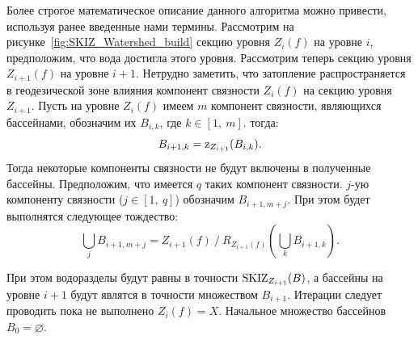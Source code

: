\documentclass[14pt, a4paper]{extreport}
\begin{document}
	Более строгое математическое описание данного алгоритма можно привести, используя ранее введенные нами термины. Рассмотрим на рисунке~\ref{fig:SKIZ_Watershed_build} секцию уровня $Z_i(f)$ на уровне $i$, предположим, что вода достигла этого уровня. Рассмотрим теперь секцию уровня $Z_{i + 1}(f)$ на уровне $i + 1$. Нетрудно заметить, что затопление распространяется в геодезической зоне влияния компонент связности $Z_i(f)$ на секцию уровня $Z_{i+1}$. Пусть на уровне $Z_i(f)$ имеем $m$ компонент связности, являющихся бассейнами, обозначим их $B_{i,k}$, где $k \in [1,~m]$. тогда:\vspace*{-0.3cm}
	\begin{equation*}
		B_{i+1,k} = \textup{z}_{Z_{i + 1}}(B_{i,k}).
		\vspace*{-0.3cm}
		\label{IZ_X(Y)}
	\end{equation*}
	Тогда некоторые компоненты связности не будут включены в полученные бассейны. Предположим, что имеется $q$ таких компонент связности. $j$-ую компоненту связности ($j \in [1,~q]$) обозначим $B_{i+1,m+j}$. При этом будет выполнятся следующее тождество:
	\begin{equation*}
		\bigcup_{j} B_{i+1,m+j} = Z_{i+1}(f)~/~R_{Z_{i + 1}(f)}\left(\bigcup_{k} B_{i+1,k}\right).
		\label{IZ_X(Y)}
	\end{equation*}
	
	При этом водоразделы будут равны в точности $\textup{SKIZ}_{Z_{i+1}}(B)$, а бассейны на уровне $i+1$ будут являтся в точности множеством $B_{i+1}$. Итерации следует проводить пока не выполнено $Z_i(f) = X$. Начальное множество бассейнов $B_0 = \varnothing$.
	
\end{document}
